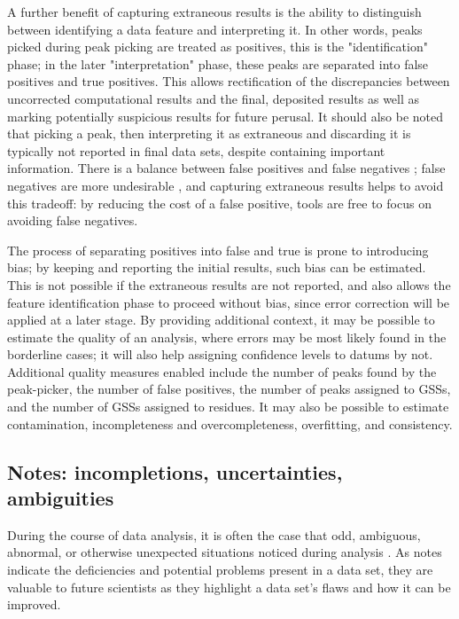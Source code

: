 A further benefit of capturing extraneous results is the ability to distinguish
between identifying a data feature and interpreting it.  In other words, peaks
picked during peak picking are treated as positives, this is the "identification"
phase; in the later "interpretation" phase, these peaks are separated into
false positives and true positives.  This allows rectification of the 
discrepancies between uncorrected computational results and the final,
deposited results as well as marking potentially suspicious results for 
future perusal.  It should also be noted that picking a peak, then
interpreting it as extraneous and discarding it is typically not reported in
final data sets, despite containing important information.
There is a balance between false positives and false negatives \cite{pine};
false negatives are more undesirable \cite{pine, saga, guntert2009automated},
and capturing extraneous results helps to avoid this tradeoff: by reducing
the cost of a false positive, tools are free to focus on avoiding false
negatives.

The process of separating positives into false and true is prone to 
introducing bias; by keeping and reporting the initial results, such bias
can be estimated.  This is not possible if the extraneous results are not
reported, and also allows the feature identification phase to proceed
without bias, since error correction will be applied at a later stage. 
By providing additional context, it may be possible to estimate the quality 
of an analysis, where errors may be most likely found in the borderline 
cases; it will also help assigning confidence levels to datums by not.
Additional quality measures enabled include the number of peaks found by the
peak-picker, the number of false positives, the number of peaks assigned to
GSSs, and the number of GSSs assigned to residues.  It may also be possible
to estimate contamination, incompleteness and overcompleteness, overfitting, 
and consistency.


\subsection*{Notes: incompletions, uncertainties, ambiguities}
During the course of data analysis, it is often the case that odd, ambiguous,
abnormal, or otherwise unexpected situations noticed during analysis
\cite{nuseibeh2000inconsistency}.  
As notes indicate the deficiencies and 
potential problems present in a data set, they are valuable to future 
scientists as they highlight a data set's flaws and how it can be improved.

